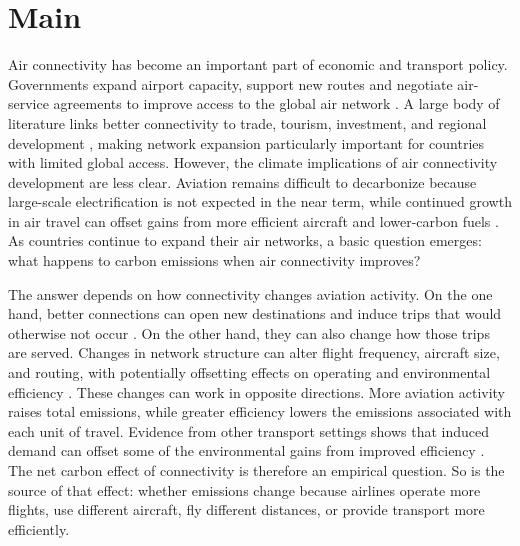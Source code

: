 \documentclass[12pt]{extarticle}
\begin{document}
\section*{Main}
Air connectivity has become an important part of economic and transport
policy. Governments expand airport capacity, support new routes and
negotiate air-service agreements to improve access to the global air
network \citep{fageda2018,piermartini2013}. A large body of literature
links better connectivity to trade, tourism, investment, and regional
development \citep{lenaerts2021,zhang2020}, making network expansion
particularly important for countries with limited global access. However,
the climate implications of air connectivity development are less clear.
Aviation remains difficult to decarbonize because large-scale
electrification is not expected in the near term, while continued growth
in air travel can offset gains from more efficient aircraft and
lower-carbon fuels \citep{bergero2023,sacchi2023}. As countries continue
to expand their air networks, a basic question emerges: what happens to
carbon emissions when air connectivity improves?

The answer depends on how connectivity changes aviation activity. On the
one hand, better connections can open new destinations and induce trips
that would otherwise not occur \citep{koo2017,piermartini2013}. On the
other hand, they can also change how those trips are served. Changes in
network structure can alter flight frequency, aircraft size, and routing,
with potentially offsetting effects on operating and environmental
efficiency \citep{brueckner2004,pels2021}. These changes can work in
opposite directions. More aviation activity raises total emissions, while
greater efficiency lowers the emissions associated with each unit of
travel. Evidence from other transport settings shows that induced demand
can offset some of the environmental gains from improved efficiency
\citep{hymel2010,ou2024}. The net carbon effect of connectivity is
therefore an empirical question. So is the source of that effect: whether
emissions change because airlines operate more flights, use different
aircraft, fly different distances, or provide transport more efficiently.
\end{document}
